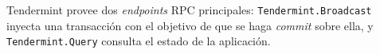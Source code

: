 Tendermint provee dos \textit{endpoints} RPC principales: \texttt{Tendermint.Broadcast}
inyecta una transacción con el objetivo de que se haga \textit{commit} sobre ella, y
\texttt{Tendermint.Query} consulta el estado de la aplicación.
%

